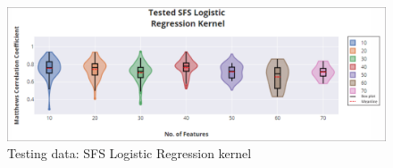 \documentclass[a4paper,twocolumn]{article} %
\begin{document}
		\begin{figure}[h]
		\begin{center}
			\includegraphics[width=500pt]{Tested_SFS_Logistic_Regression_Kernel.PNG}
			\caption{Testing data: SFS Logistic Regression kernel}
			\label{fig:Test_SFS_Logistic}
		\end{center}
	\end{figure}
	
\end{document}

